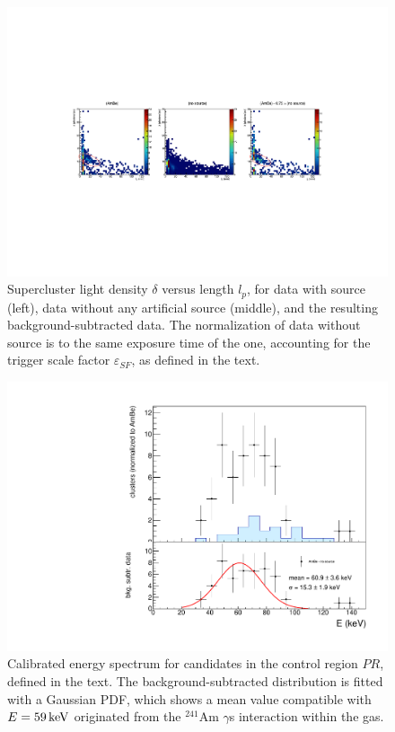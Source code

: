 \begin{figure}[ht]
  \begin{center}
  \includegraphics[width=0.90\linewidth]{figures/densityvslength_zoom}

  \caption{Supercluster light density $\delta$ versus length $l_p$,
    for data with \ambe source (left), data without any artificial source
    (middle), and the resulting background-subtracted \ambe data.  The
    normalization of data without source is to the same exposure time
    of the \ambe one, accounting for the trigger scale factor
    $\varepsilon_{SF}$, as defined in the text. \label{fig:dvsl}}

  \end{center}
\end{figure}

\begin{figure}[ht]
  \begin{center}
  \includegraphics[width=0.60\linewidth]{figures/calintegral_59keV}

  \caption{Calibrated energy spectrum for candidates in the control
    region $PR$, defined in the text. The background-subtracted
    distribution is fitted with a Gaussian PDF, which shows a mean
    value compatible with $E=59\,\textrm{ke\hspace{-.08em}V}$ originated from the $^{241}$Am
    $\gamma$s interaction within the gas. \label{fig:59keV}}

  \end{center}
\end{figure}

